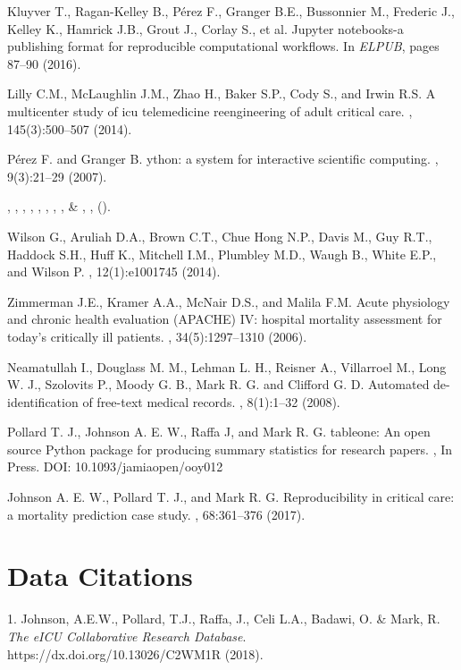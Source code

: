 \documentclass[english]{article}
\begin{document}
\begin{thebibliography}{1}
Kluyver T., Ragan-Kelley B., P{\'e}rez F., Granger B.E., Bussonnier M., Frederic J., Kelley K., Hamrick J.B., Grout J., Corlay S., et al.
\newblock Jupyter notebooks-a publishing format for reproducible computational
  workflows.
\newblock In {\em ELPUB}, pages 87--90 (2016).

Lilly C.M., McLaughlin J.M., Zhao H., Baker S.P., Cody S.,
  and Irwin R.S.
\newblock A multicenter study of icu telemedicine reengineering of adult
  critical care.
, 145(3):500--507 (2014).

P\'erez F. and Granger B.
ython: a system for interactive scientific computing.
, 9(3):21--29 (2007).

, ,
, ,
, ,
, ,
 \& ,
\newblock {}
\newblock \emph{}
  \textbf{}, 
  ().

Wilson G., Aruliah D.A., Brown C.T., Chue Hong N.P., Davis M., Guy R.T., Haddock S.H., Huff K., Mitchell I.M., Plumbley M.D., Waugh B., White E.P., and Wilson P.
, 12(1):e1001745 (2014).

Zimmerman J.E., Kramer A.A., McNair D.S., and Malila F.M.
\newblock Acute physiology and chronic health evaluation ({APACHE}) {IV}: hospital
  mortality assessment for today’s critically ill patients.
, 34(5):1297--1310 (2006).

Neamatullah I., Douglass M. M., Lehman L. H., Reisner A., Villarroel M., Long W. J., Szolovits P., Moody G. B., Mark R. G. and Clifford G. D.
\newblock Automated de-identification of free-text medical records.
, 8(1):1--32 (2008).

Pollard T. J., Johnson A. E. W., Raffa J, and Mark R. G.
\newblock tableone: An open source Python package for producing summary statistics for research papers.
, In Press. DOI: 10.1093/jamiaopen/ooy012

Johnson A. E. W., Pollard T. J., and Mark R. G.
\newblock Reproducibility in critical care: a mortality prediction case study.
, 68:361--376 (2017).

\end{thebibliography}

\section*{Data Citations}

1. Johnson, A.E.W., Pollard, T.J., Raffa, J., Celi L.A., Badawi, O. \& Mark, R. \emph{The eICU Collaborative Research Database}. https://dx.doi.org/10.13026/C2WM1R (2018).
\end{document}

